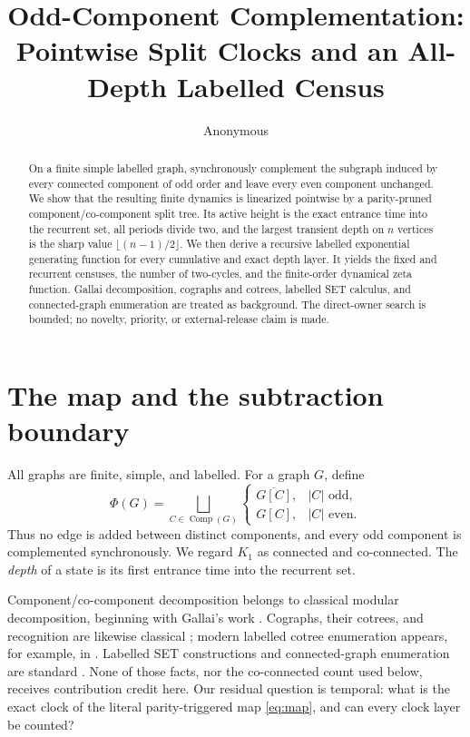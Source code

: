 \documentclass[10pt,a4paper]{amsart}
\title[Odd-component complementation]{Odd-Component Complementation:\\
Pointwise Split Clocks and an All-Depth Labelled Census}
\author{Anonymous}
\date{}
\theoremstyle{definition}
\theoremstyle{remark}
\newcommand{\Comp}{\operatorname{Comp}}
\begin{document}
\begin{abstract}
On a finite simple labelled graph, synchronously complement the subgraph
induced by every connected component of odd order and leave every even
component unchanged. We show that the resulting finite dynamics is
linearized pointwise by a parity-pruned component/co-component split tree.
Its active height is the exact entrance time into the recurrent set, all
periods divide two, and the largest transient depth on \(n\) vertices is the
sharp value \(\lfloor(n-1)/2\rfloor\). We then derive a recursive labelled
exponential generating function for every cumulative and exact depth layer.
It yields the fixed and recurrent censuses, the number of two-cycles, and the
finite-order dynamical zeta function. Gallai decomposition, cographs and
cotrees, labelled SET calculus, and connected-graph enumeration are treated
as background. The direct-owner search is bounded; no novelty, priority, or
external-release claim is made.
\end{abstract}

\maketitle

\section{The map and the subtraction boundary}

All graphs are finite, simple, and labelled. For a graph \(G\), define
\begin{equation}
 \Phi(G)=\bigsqcup_{C\in\Comp(G)}
 \begin{cases}
   \overline{G[C]},& |C|\text{ odd},\\
   G[C],& |C|\text{ even}.
 \end{cases}                                             \label{eq:map}
\end{equation}
Thus no edge is added between distinct components, and every odd component
is complemented synchronously. We regard \(K_1\) as connected and
co-connected. The \emph{depth} of a state is its first entrance time into
the recurrent set.

Component/co-component decomposition belongs to classical modular
decomposition, beginning with Gallai's work \cite{Gallai1967}. Cographs,
their cotrees, and recognition are likewise classical
\cite{CorneilLerchsStewart1981,CorneilPerlStewart1985}; modern labelled
cotree enumeration appears, for example, in \cite{Stufler2021,BassinoEtAl2022}.
Labelled SET constructions and connected-graph enumeration are standard
\cite{BergeronLabelleLeroux1998,HararyPalmer1973}. None of those facts,
nor the co-connected count used below, receives contribution credit here.
Our residual question is temporal: what is the exact clock of the literal
parity-triggered map \eqref{eq:map}, and can every clock layer be counted?
\end{document}
